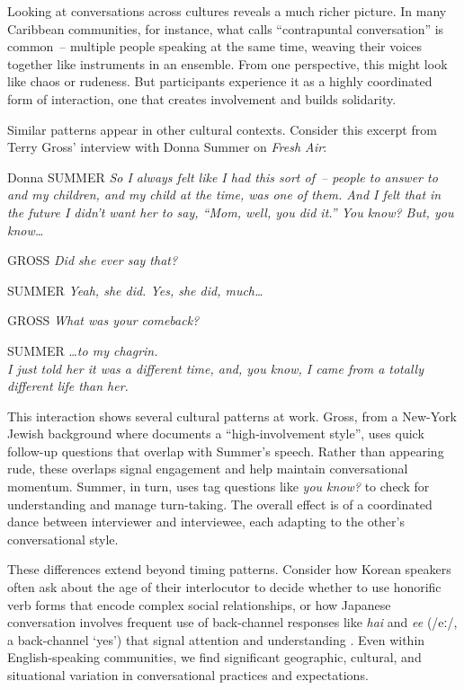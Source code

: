 Looking at conversations across cultures reveals a much richer picture. In many Caribbean communities, for instance, what \citet{reisman1974} calls ``contrapuntal conversation'' is common~-- multiple people speaking at the same time, weaving their voices together like instruments in an ensemble. From one perspective, this might look like chaos or rudeness. But participants experience it as a highly coordinated form of interaction, one that creates involvement and builds solidarity.

Similar patterns appear in other cultural contexts. Consider this excerpt from Terry Gross' interview with Donna Summer on \textit{Fresh Air}:

\ea
\begin{dialogue}
\item[Donna SUMMER] \textit{So I always felt like I had this sort of~-- people to answer to and my children, and my child at the time, was one of them. And I felt that in the future I didn't want her to say, ``Mom, well, you did it.'' You know? But, you know\dots} 
\item[GROSS] \hspace{2.7cm}\textit{Did she ever say that?} 
\item[SUMMER] \textit{Yeah, she did. Yes, she did, much\dots}
\item[GROSS] \hspace{2cm}\textit{What was your comeback?} 
\item[SUMMER] \hspace{5cm}\dots\textit{to my chagrin.\\I just told her it was a different time, and, you know, I came from a totally different life than her.}
\end{dialogue}
\z
This interaction shows several cultural patterns at work. Gross, from a New-York Jewish background where \citet{tannen1984} documents a ``high-involvement style'', uses quick follow-up questions that overlap with Summer's speech. Rather than appearing rude, these overlaps signal engagement and help maintain conversational momentum. Summer, in turn, uses tag questions like \textit{you know?} to check for understanding and manage turn-taking. The overall effect is of a coordinated dance between interviewer and interviewee, each adapting to the other's conversational style.

These differences extend beyond timing patterns. Consider how Korean speakers often ask about the age of their interlocutor to decide whether to use honorific verb forms that encode complex social relationships, or how Japanese conversation involves frequent use of back-channel responses like \textit{hai} and \textit{ee} (/eː/, a back-channel `yes') that signal attention and understanding \citep{maynard1986}. Even within English-speaking communities, we find significant geographic, cultural, and situational variation in conversational practices and expectations.

